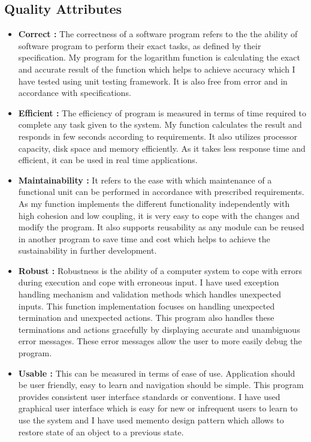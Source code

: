 \documentclass[12pt]{report}
\begin{document}
{   
\subsection{Quality Attributes}

\begin{itemize}
    \item \textbf{Correct :} The correctness of a software program refers to the the ability of software program to perform their exact tasks, as defined by their specification. 
    My program for the logarithm function is calculating the exact and accurate result of the function which helps to achieve accuracy which I have tested using unit testing framework. It is also free from error and in accordance with specifications.
    \item\textbf{Efficient :} The efficiency of program is measured in terms of time required to complete any task given to the system. My function calculates the result and responds in few seconds according to requirements. It also utilizes processor capacity, disk space and memory efficiently. As it takes less response time and efficient, it can be used in real time applications.
    \item\textbf{Maintainability :} It refers to the ease with which maintenance of a functional unit can be performed in accordance with prescribed requirements. As my function implements the different functionality independently with high cohesion and low coupling, it is very easy to cope with the changes and modify the program. It also supports reusability as any module can be reused in another program to save time and cost which helps to achieve the sustainability in further development.
    \item\textbf{Robust :} Robustness is the ability of a computer system to cope with errors during execution and cope with erroneous input. I have used exception handling mechanism and validation methods which handles unexpected inputs. This function implementation focuses on handling unexpected termination and unexpected actions. This program also handles these terminations and actions gracefully by displaying accurate and unambiguous error messages. These error messages allow the user to more easily debug the program.
    \item\textbf{Usable :} This can be measured in terms of ease of use. Application should be user friendly, easy to learn and navigation should be simple. This program provides consistent user interface standards or conventions. I have used graphical user interface which is easy for new or infrequent users to learn to use the system and I have used memento design pattern which allows to restore state of an object to a previous state.
\end{itemize}
   
}
\end{document}
